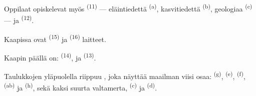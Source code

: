 Oppilaat opiskelevat myös  \textsuperscript{(11)} ---
eläintiedettä \textsuperscript{(a)}, kasvitiedettä \textsuperscript{(b)},
geologiaa \textsuperscript{(c)} --- ja 
\textsuperscript{(12)}.

Kaapissa ovat  \textsuperscript{(15)} ja 
\textsuperscript{(16)} laitteet.

Kaapin päällä on:  \textsuperscript{(14)},  ja
 \textsuperscript{(13)}.

Taulukkojen yläpuolella riippuu , joka näyttää maailman viisi
osaa:  \textsuperscript{(g)}, 
\textsuperscript{(e)},  \textsuperscript{(f)},
 \textsuperscript{(ab)} ja 
\textsuperscript{(h)}, sekä kaksi suurta valtamerta, 
\textsuperscript{(c)} ja  \textsuperscript{(d)}.
\VUsaut{6.0mm}
\VUfilet{22mm}
